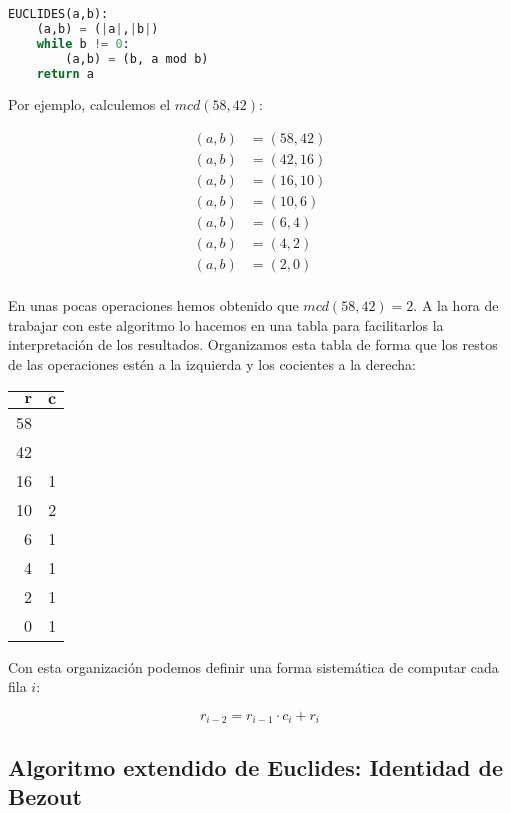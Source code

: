 \begin{lstlisting}[language=Python]
EUCLIDES(a,b):
	(a,b) = (|a|,|b|)
	while b != 0:
		(a,b) = (b, a mod b)
	return a
\end{lstlisting}

Por ejemplo, calculemos el $mcd(58,42)$:

\begin{align*}
	(a,b) & = (58, 42) \\
	(a,b) & = (42, 16) \\
	(a,b) & = (16, 10) \\
	(a,b) & = (10, 6)  \\
	(a,b) & = (6, 4)   \\
	(a,b) & = (4, 2)   \\
	(a,b) & = (2, 0)   \\
\end{align*}

En unas pocas operaciones hemos obtenido que $mcd(58,42) = 2$.
A la hora de trabajar con este algoritmo lo hacemos en una tabla para facilitarlos la interpretación de los resultados.
Organizamos esta tabla de forma que los restos de las operaciones estén a la izquierda y los cocientes a la derecha:

\begin{center}
\begin{tabular}{r r}
  $\boldsymbol{r}$ & $\boldsymbol{c}$ \\
	\toprule
	58              &                  \\
	42              &                  \\
	16              & 1                \\
	10              & 2                \\
	6               & 1                \\
	4               & 1                \\
	2               & 1                \\
	0               & 1                \\
\end{tabular}
\end{center}

Con esta organización podemos definir una forma sistemática de computar cada fila $i$:

\[r_{i-2} = r_{i-1} \cdot c_i + r_i\]

\subsection{Algoritmo extendido de Euclides: Identidad de Bezout}

